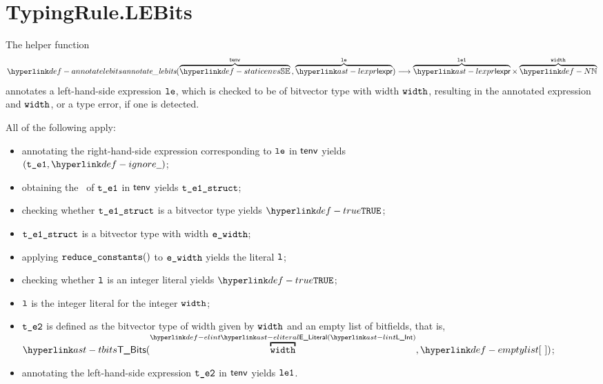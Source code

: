 
\section{TypingRule.LEBits \label{sec:TypingRule.LEBits}}
\hypertarget{def-annotatelebits}{}
The helper function
\[
  \annotatelebits(\overname{\staticenvs}{\tenv} \aslsep \overname{\lexpr}{\vle})
  \aslto \overname{\lexpr}{\vleone} \times \overname{\N}{\width}
\]
annotates a left-hand-side expression $\texttt{le}$, which is checked to be of bitvector type
with width $\texttt{width}$,
resulting in the annotated expression and $\texttt{width}$, or a type error, if one is detected.

All of the following apply:
\begin{itemize}
  \item annotating the right-hand-side expression corresponding to $\texttt{le}$ in $\textsf{tenv}$ yields \\ $(\vteone, \Ignore)$\ProseOrTypeError;
  \item obtaining the \structure\ of $\texttt{t\_e1}$ in $\textsf{tenv}$ yields $\texttt{t\_e1\_struct}$\ProseOrTypeError;
  \item checking whether $\texttt{t\_e1\_struct}$ is a bitvector type yields $\True$\ProseOrTypeError;
  \item $\texttt{t\_e1\_struct}$ is a bitvector type with width $\texttt{e\_width}$;
  \item applying $\reduceconstants$ to $\texttt{e\_width}$ yields the literal $\texttt{l}$\ProseOrTypeError;
  \item checking whether $\texttt{l}$ is an integer literal yields $\True$\ProseOrTypeError;
  \item $\texttt{l}$ is the integer literal for the integer $\texttt{width}$;
  \item $\texttt{t\_e2}$ is defined as the bitvector type of width given by $\texttt{width}$ and an empty list of bitfields, that is,
        $\TBits(\ELInt{\width}, \emptylist)$;
  \item annotating the left-hand-side expression $\texttt{t\_e2}$ in $\textsf{tenv}$ yields $\texttt{le1}$\ProseOrTypeError.
\end{itemize}

